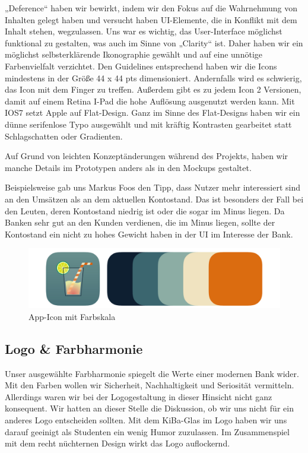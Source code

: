 	„Deference“ haben wir bewirkt, indem wir den Fokus auf die Wahrnehmung von Inhalten gelegt haben und versucht haben UI-Elemente, die in Konflikt mit dem Inhalt stehen, wegzulassen. Uns war es wichtig, das User-Interface möglichst funktional zu gestalten, was auch im Sinne von „Clarity“ ist. Daher haben wir ein möglichst selbsterklärende Ikonographie gewählt und auf eine unnötige Farbenvielfalt verzichtet. Den Guidelines entsprechend haben wir die Icons mindestens in der Größe 44 x 44 pts dimensioniert. Andernfalls wird es schwierig, das Icon mit dem Finger zu treffen. Außerdem gibt es zu jedem Icon 2 Versionen, damit auf einem Retina I-Pad die hohe Auflösung ausgenutzt werden kann. Mit IOS7 setzt Apple auf Flat-Design. Ganz im Sinne des Flat-Designs haben wir ein dünne serifenlose Typo ausgewählt und mit kräftig Kontrasten gearbeitet statt Schlagschatten oder Gradienten.

	Auf Grund von leichten Konzeptänderungen während des Projekts, haben wir manche Details im Prototypen anders als in den Mockups gestaltet.
	
	Beispielsweise gab uns Markus Foos den Tipp, dass Nutzer mehr interessiert sind an den Umsätzen als an dem aktuellen Kontostand. Das ist besonders der Fall bei den Leuten, deren Kontostand niedrig ist oder die sogar im Minus liegen. Da Banken sehr gut an den Kunden verdienen, die im Minus liegen, sollte der Kontostand ein nicht zu hohes Gewicht haben in der UI im Interesse der Bank. \par

\begin{figure}[h]
	\centering
	\includegraphics[scale=.52]{Pictures/Logo}
	\caption{App-Icon mit Farbskala}
\end{figure}
\subsection{Logo \& Farbharmonie}
	Unser ausgewählte Farbharmonie spiegelt die Werte einer modernen Bank wider. Mit den Farben wollen wir Sicherheit, Nachhaltigkeit und Seriosität vermitteln. Allerdings waren wir bei der Logogestaltung in dieser Hinsicht nicht ganz konsequent. Wir hatten an dieser Stelle die Diskussion, ob wir uns nicht für ein anderes Logo entscheiden sollten. Mit dem KiBa-Glas im Logo haben wir uns darauf geeinigt als Studenten ein wenig Humor zuzulassen. Im Zusammenspiel mit dem recht nüchternen Design wirkt das Logo auflockernd.

